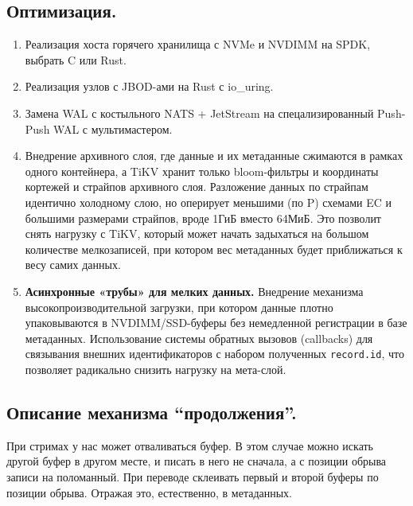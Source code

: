 \documentclass[a4paper,12pt]{article}
\begin{document}
    \subsection{Оптимизация.}
    \begin{enumerate}
        \item Реализация хоста горячего хранилища с NVMe и NVDIMM на SPDK, выбрать C или Rust.
        \item Реализация узлов с JBOD-ами на Rust с io\_uring.
        \item Замена WAL с костыльного NATS + JetStream на спецализированный Push-Push WAL с мультимастером.
        \item Внедрение архивного слоя, где данные и их метаданные сжимаются в рамках одного контейнера, а TiKV хранит только bloom-фильтры и координаты
        кортежей и страйпов архивного слоя. Разложение данных по страйпам идентично холодному слою, но оперирует меньшими (по P) схемами EC и большими
        размерами страйпов, вроде 1ГиБ вместо 64МиБ. Это позволит снять нагрузку с TiKV, который может начать задыхаться на большом количестве мелкозаписей,
        при котором вес метаданных будет приближаться к весу самих данных.
        \item \textbf{Асинхронные «трубы» для мелких данных.}
        Внедрение механизма высокопроизводительной загрузки, при котором данные плотно упаковываются в NVDIMM/SSD-буферы без немедленной регистрации
        в базе метаданных. Использование системы обратных вызовов (callbacks) для связывания внешних идентификаторов с набором полученных
        \texttt{record.id}, что позволяет радикально снизить нагрузку на мета-слой.
    \end{enumerate}

    \subsection{Описание механизма \enquote{продолжения}.}

    При стримах у нас может отваливаться буфер. В этом случае можно искать другой буфер в другом месте, и писать в него не сначала, а с позиции обрыва записи на поломанный.
    При переводе склеивать первый и второй буферы по позиции обрыва. Отражая это, естественно, в метаданных.
\end{document}
